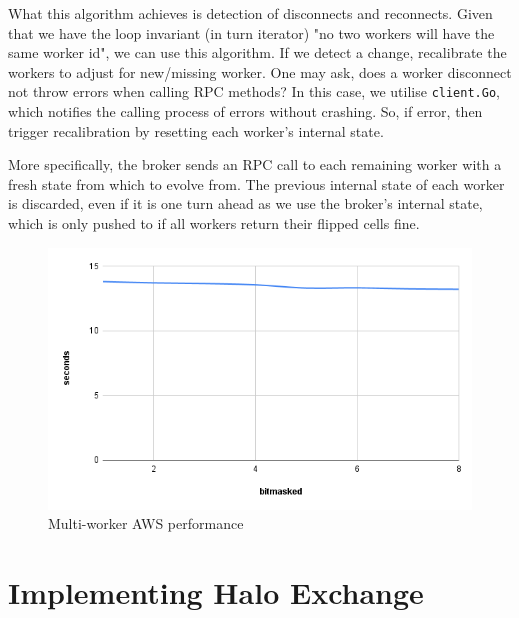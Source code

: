 \documentclass[twoside,twocolumn]{article}
\begin{document}
What this algorithm achieves is detection of disconnects and reconnects.
Given that we have the loop invariant (in turn iterator) "no two workers will have the same worker id",
we can use this algorithm. If we detect a change, recalibrate the workers to adjust for new/missing worker. 
One may ask, does a worker disconnect not throw errors when calling RPC methods? In this case, we utilise \texttt{client.Go},
which notifies the calling process of errors without crashing. So, if error, then trigger recalibration by resetting each worker's
internal state.

More specifically, the broker sends an RPC call to each remaining worker with a fresh state from which to 
evolve from. The previous internal state of each worker is discarded, even if it is one turn ahead as we use the broker's
internal state, which is only pushed to if all workers return their flipped cells fine.
\begin{figure}
  \includegraphics[width=\linewidth]{halo.png}
  \caption{Multi-worker AWS performance}
  \label{fig:chart7}
\end{figure}

\section{Implementing Halo Exchange}
\end{document}
